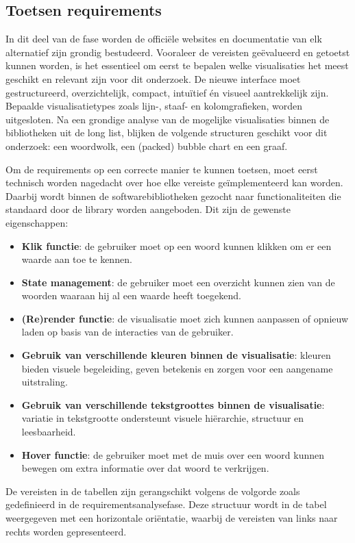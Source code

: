 \subsection{Toetsen requirements}
In dit deel van de fase worden de officiële websites en documentatie van elk alternatief zijn grondig bestudeerd. Vooraleer de vereisten geëvalueerd en getoetst kunnen worden, is het essentieel om eerst te bepalen welke visualisaties het meest geschikt en relevant zijn voor dit onderzoek. De nieuwe interface moet gestructureerd, overzichtelijk, compact, intuïtief én visueel aantrekkelijk zijn. Bepaalde visualisatietypes zoals lijn-, staaf- en kolomgrafieken, worden uitgesloten. Na een grondige analyse van de mogelijke visualisaties binnen de bibliotheken uit de long list, blijken de volgende structuren geschikt voor dit onderzoek: een woordwolk, een (packed) bubble chart en een graaf.\medskip\par
Om de requirements op een correcte manier te kunnen toetsen, moet eerst technisch worden nagedacht over hoe elke vereiste geïmplementeerd kan worden. Da\-arbij wordt binnen de softwarebibliotheken gezocht naar functionaliteiten die standaard door de library worden aangeboden. Dit zijn de gewenste eigenschappen:
\begin{itemize}
    \item \textbf{Klik functie}: de gebruiker moet op een woord kunnen klikken om er een waarde aan toe te kennen.
    \item \textbf{State management}: de gebruiker moet een overzicht kunnen zien van de woorden waaraan hij al een waarde heeft toegekend.
    \item \textbf{(Re)render functie}: de visualisatie moet zich kunnen aanpassen of opnieuw laden op basis van de interacties van de gebruiker.
    \item \textbf{Gebruik van verschillende kleuren binnen de visualisatie}: kleuren bieden visuele begeleiding, geven betekenis en zorgen voor een aangename uitstraling.
    \item \textbf{Gebruik van verschillende tekstgroottes binnen de visualisatie}: variatie in tekstgrootte ondersteunt visuele hiërarchie, structuur en leesbaarheid.
    \item \textbf{Hover functie}: de gebruiker moet met de muis over een woord kunnen bewegen om extra informatie over dat woord te verkrijgen.
\end{itemize}

De vereisten in de tabellen zijn gerangschikt volgens de volgorde zoals gedefinieerd in de requirementsanalysefase. Deze structuur wordt in de tabel weergegeven met een horizontale oriëntatie, waarbij de vereisten van links naar rechts worden gepresenteerd.

